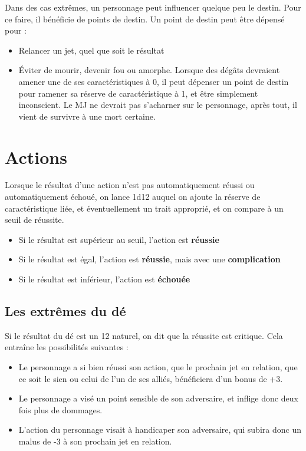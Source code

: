 \documentclass[10pt,twoside,twocolumn,openany,bg=print,justified]{dndbook}
\begin{document}
Dans des cas extrêmes, un personnage peut influencer quelque peu le destin. Pour ce faire, il bénéficie de points de destin. Un point de destin peut être dépensé pour :

\begin{itemize}
	\item Relancer un jet, quel que soit le résultat
	\item Éviter de mourir, devenir fou ou amorphe. Lorsque des dégâts devraient amener une de ses caractéristiques à 0, il peut dépenser un point de destin pour ramener sa réserve de caractéristique à 1, et être simplement inconscient. Le MJ ne devrait pas s'acharner sur le personnage, après tout, il vient de survivre à une mort certaine.
\end{itemize}

\section{Actions}

Lorsque le résultat d'une action n'est pas automatiquement réussi ou automatiquement échoué, on lance 1d12 auquel on ajoute la réserve de caractéristique liée, et éventuellement un trait approprié, et on compare à un seuil de réussite. 

\begin{itemize}
	\item Si le résultat est supérieur au seuil, l'action est \textbf{réussie}
	\item Si le résultat est égal, l'action est \textbf{réussie}, mais avec une \textbf{complication}
	\item Si le résultat est inférieur, l'action est \textbf{échouée}
\end{itemize}

\subsection*{Les extrêmes du dé}

Si le résultat du dé est un 12 naturel, on dit que la réussite est critique. Cela entraîne les possibilités suivantes :

\begin{itemize}
	\item Le personnage a si bien réussi son action, que le prochain jet en relation, que ce soit le sien ou celui de l'un de ses alliés, bénéficiera d'un bonus de +3.
	\item Le personnage a visé un point sensible de son adversaire, et inflige donc deux fois plus de dommages.
	\item L'action du personnage visait à handicaper son adversaire, qui subira donc un malus de -3 à son prochain jet en relation.
\end{itemize}
\end{document}
